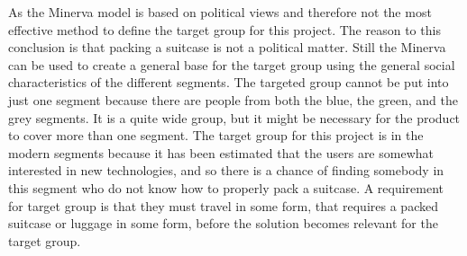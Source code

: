As the Minerva model is based on political views and therefore not the most effective method to define the target group for this project. The reason to this conclusion is that packing a suitcase is not a political matter.
Still the Minerva can be used to create a general base for the target group using the general social characteristics of the different segments.
The targeted group cannot be put into just one segment because there are people from both the blue, the green, and the grey segments. It is a quite wide group, but it might be necessary for the product to cover more than one segment.
The target group for this project is in the modern segments because it has been estimated that the users are somewhat interested in new technologies, and so there is a chance of finding somebody in this segment who do not know how to properly pack a suitcase.
A requirement for target group is that they must travel in some form, that requires a packed suitcase or luggage in some form, before the solution becomes relevant for the target group.